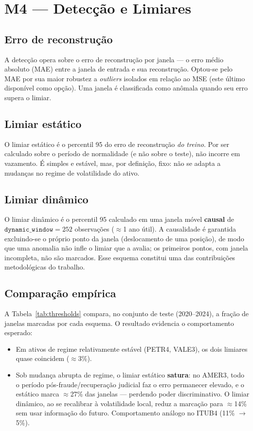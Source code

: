 \section{M4 --- Detecção e Limiares}
\label{sec:m4}

\subsection{Erro de reconstrução}
A detecção opera sobre o erro de reconstrução por janela --- o erro médio absoluto (MAE)
entre a janela de entrada e sua reconstrução. Optou-se pelo MAE por sua maior robustez a
\emph{outliers} isolados em relação ao MSE (este último disponível como opção). Uma janela
é classificada como anômala quando seu erro supera o limiar.

\subsection{Limiar estático}
O limiar estático é o percentil 95 do erro de reconstrução \emph{do treino}. Por ser
calculado sobre o período de normalidade (e não sobre o teste), não incorre em vazamento.
É simples e estável, mas, por definição, fixo: não se adapta a mudanças no regime de
volatilidade do ativo.

\subsection{Limiar dinâmico}
O limiar dinâmico é o percentil 95 calculado em uma janela móvel \textbf{causal} de
$\texttt{dynamic\_window}=252$ observações ($\approx$1 ano útil). A causalidade é garantida
excluindo-se o próprio ponto da janela (deslocamento de uma posição), de modo que uma
anomalia não infle o limiar que a avalia; os primeiros pontos, com janela incompleta, não
são marcados. Esse esquema constitui uma das contribuições metodológicas do trabalho.

\subsection{Comparação empírica}
A Tabela~\ref{tab:thresholds} compara, no conjunto de teste (2020--2024), a fração de
janelas marcadas por cada esquema. O resultado evidencia o comportamento esperado:
\begin{itemize}[noitemsep]
  \item Em ativos de regime relativamente estável (PETR4, VALE3), os dois limiares quase
        coincidem ($\approx$3\%).
  \item Sob mudança abrupta de regime, o limiar estático \textbf{satura}: no AMER3, todo o
        período pós-fraude/recuperação judicial faz o erro permanecer elevado, e o estático
        marca $\approx$27\% das janelas --- perdendo poder discriminativo. O limiar dinâmico,
        ao se recalibrar à volatilidade local, reduz a marcação para $\approx$14\% sem usar
        informação do futuro. Comportamento análogo no ITUB4 (11\% $\to$ 5\%).
\end{itemize}

